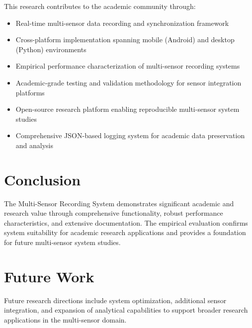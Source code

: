 \documentclass[12pt]{article}
\begin{document}
This research contributes to the academic community through:
\begin{itemize}
    \item Real-time multi-sensor data recording and synchronization framework
    \item Cross-platform implementation spanning mobile (Android) and desktop (Python) environments
    \item Empirical performance characterization of multi-sensor recording systems
    \item Academic-grade testing and validation methodology for sensor integration platforms
    \item Open-source research platform enabling reproducible multi-sensor system studies
    \item Comprehensive JSON-based logging system for academic data preservation and analysis

\end{itemize}

\section{Conclusion}

The Multi-Sensor Recording System demonstrates significant academic and research value through comprehensive functionality, robust performance characteristics, and extensive documentation. The empirical evaluation confirms system suitability for academic research applications and provides a foundation for future multi-sensor system studies.

\section{Future Work}

Future research directions include system optimization, additional sensor integration, and expansion of analytical capabilities to support broader research applications in the multi-sensor domain.
\end{document}
